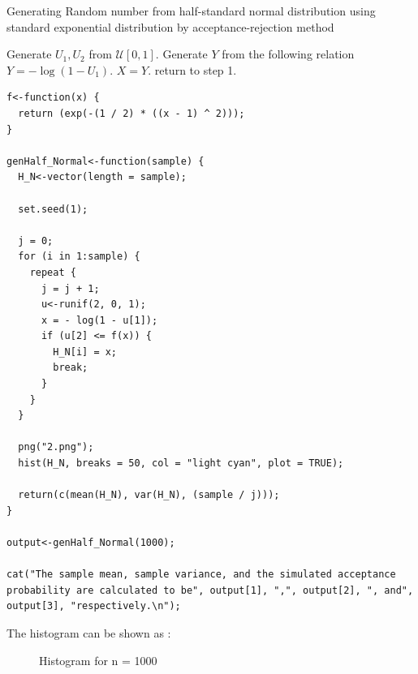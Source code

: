 \documentclass[11pt]{article}
\begin{document}
\begin{algorithm}[H]
\caption{Generating Random number from half-standard normal distribution using standard exponential distribution by acceptance-rejection method}
\begin{algorithmic}[1]
\STATE Generate $U_1, U_2$ from $\mathcal{U}[0,1]$.
\STATE Generate $Y$ from the following relation $Y = -\log(1 - U_1)$.
{}
  \STATE  $X = Y$.
\ELSE
  \STATE  return to step 1.
\ENDIF
\end{algorithmic}
\end{algorithm}

\newpage


\begin{lstlisting}
f<-function(x) {
  return (exp(-(1 / 2) * ((x - 1) ^ 2)));
}

genHalf_Normal<-function(sample) {
  H_N<-vector(length = sample);

  set.seed(1);

  j = 0;
  for (i in 1:sample) {
    repeat {
      j = j + 1;
      u<-runif(2, 0, 1);
      x = - log(1 - u[1]);
      if (u[2] <= f(x)) {
        H_N[i] = x;
        break;
      }
    }
  }

  png("2.png");
  hist(H_N, breaks = 50, col = "light cyan", plot = TRUE);

  return(c(mean(H_N), var(H_N), (sample / j)));
}

output<-genHalf_Normal(1000);

cat("The sample mean, sample variance, and the simulated acceptance probability are calculated to be", output[1], ",", output[2], ", and", output[3], "respectively.\n");

\end{lstlisting}
\newpage
{}

The histogram can be shown as :

\begin{figure}[H]
  \centering
    \caption{Histogram for n = 1000}
\end{figure}
\end{document}
